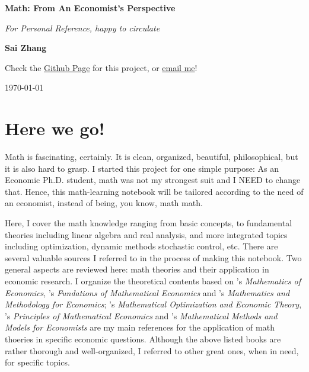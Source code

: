 \documentclass[12pt,openany]{report}
\begin{document}
\begin{titlepage}
    \begin{center}
        \vspace*{1cm}
        
        \Huge
        \textbf{Math: From An Economist's Perspective}

        \Large
        \textit{For Personal Reference, happy to circulate}
            
        \vspace{2.5cm}
        
        \LARGE    
        \textbf{Sai Zhang}
            
        \vfill
        
        \large    
        Check the \href{https://github.com/SaiChrisZHANG/Math-in-Economics}{Github Page} for this project, or \href{mailto:saizhang.econ@gmail.com}{email me}!

        \vspace{0.8cm}
        \large
        \today
            
    \end{center}
\end{titlepage}


\chapter*{Here we go!}

Math is fascinating, certainly. It is clean, organized, beautiful, philosophical,
but it is also hard to grasp. I started this project for one simple purpose: As an Economic Ph.D. student, 
math was not my strongest suit and I NEED to change that. Hence, this
math-learning notebook will be tailored according to the need of an economist,
instead of being, you know, math math.

Here, I cover the math knowledge ranging from basic concepts, to fundamental theories including 
linear algebra and real analysis, and more integrated topics including optimization, dynamic methods stochastic control, etc.
There are several valuable sources I referred to in the process of making this notebook. Two general aspects are reviewed here: 
math theories and their application in economic research. I organize
the theoretical contents based on \citet{hoy2011mathematics}'s \textit{Mathematics of Economics}, 
\citet{carter2001foundations}'s \textit{Fundations of Mathematical Economics} and \citet{eichhornmathematics}'s 
\textit{Mathematics and Methodology for Economics}; \citet{intriligator2002mathematical}'s \textit{Mathematical Optimization and Economic Theory},
 \citet{vali2014principles}'s \textit{Principles of Mathematical Economics}
and \citet{de2000mathematical}'s \textit{Mathematical Methods and Models for Economists} are my main references
for the application of math thoeries in specific economic questions. Although the above listed books are
rather thorough and well-organized, I referred to other great ones, when in need, for specific topics.
\end{document}

